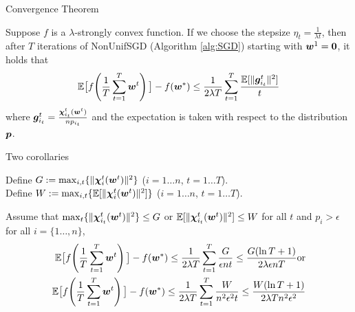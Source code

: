 \begin{frame}{Convergence Theorem}
\begin{theorem}
\label{theorem:basicSGD}
 Suppose $f$ is a $\lambda$-strongly convex function. If we choose the stepsize $\eta_t = \frac{1}{\lambda t }$, then after $T$ iterations of NonUnifSGD (Algorithm \ref{alg:SGD}) starting with $\bm{w}^{1}=\bm{0}$, it holds that
    \[
        \mathbb{E}\big[ f\!\left(\frac1T\sum_{t=1}^T \bm{w}^{t} \right) \big] - f(\bm{w}^*) \le \frac{1}{2\lambda T}\sum_{t=1}^T \frac{\mathbb{E}[\|\bm{g}_{i_t}^t\|^2]}{t}
    \]
    where $\bm{g}_{i_t}^t=\frac{\bm{\chi}_{i_t}^t(\bm{w}^{t})}{np_{i_t}}$ and the expectation is taken with respect to the distribution $\bm{p}$.
\end{theorem}
\end{frame}


\begin{frame}{Two corollaries}
\begin{definition}\label{def:WG}
Define $G := \max_{i, t}\{ \|\bm{\chi}_{i}^t(\bm{w}^{t})\|^2\}$ ($i = 1\dots n$, $t=1\dots T$). \\
Define $W := \max_{i,t}\{\mathbb{E}[\|\bm{\chi}_{i}^t(\bm{w}^{t})\|^2]\}$ ($i = 1\dots n$, $t=1\dots T$).
\end{definition}
\begin{corollary}\label{corollary:maxsubgrad}
Assume that $\max_{t}\{\|\bm{\chi}_{i_t}^t(\bm{w}^t)\|^2\} \le G$ or $\mathbb{E}[\|\bm{\chi}_{i_t}^t(\bm{w}^t)\|^2] \le W$ for all $t$ and $p_i > \epsilon$ for all $i=\{1\dots, n\}$,
    \begin{align*}
        \mathbb{E}\big[f\!\left(\frac1T\sum_{t=1}^T \bm{w}^{t} \right)\big]- f(\bm{w}^*) \le \frac{1}{2\lambda T} \sum_{t=1}^T \frac{G}{\epsilon nt}
\le \frac{G(\ln T+1)}{2\lambda \epsilon nT} \text{or}\\ 
        \mathbb{E}\big[f\!\left(\frac1T\sum_{t=1}^T \bm{w}^{t} \right)\big]- f(\bm{w}^*)  \le \frac{1}{2\lambda T}\sum_{t=1}^T \frac{W}{n^2\epsilon^2 t}
\le \frac{W(\ln T+1)}{2\lambda Tn^2\epsilon^2}
    \end{align*}
\end{corollary}
\end{frame}

